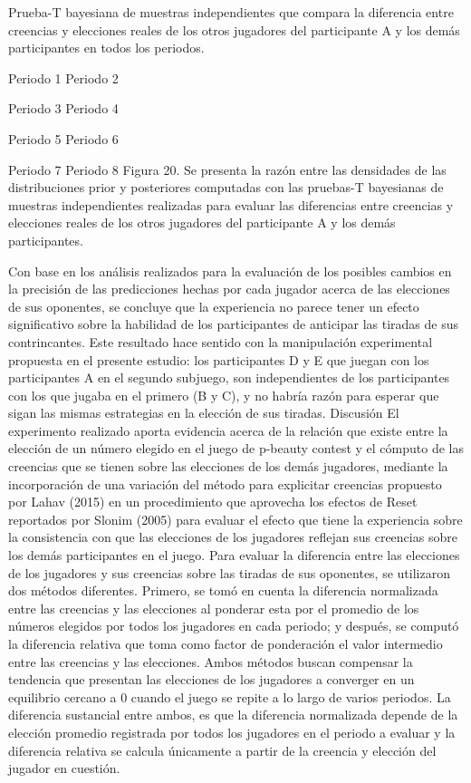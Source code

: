 Prueba-T bayesiana de muestras independientes que compara la diferencia entre creencias y elecciones reales de los otros jugadores del participante A y los demás participantes en todos los periodos.

   
Periodo 1					Periodo 2
    
Periodo 3 					Periodo 4
  
Periodo 5 					Periodo 6
  
Periodo 7 					Periodo 8
Figura 20. Se presenta la razón entre las densidades de las distribuciones prior y posteriores  computadas con las pruebas-T bayesianas de muestras independientes realizadas para evaluar las diferencias entre creencias y elecciones reales de los otros jugadores del participante A y los demás participantes.

Con base en los análisis realizados para la evaluación de los posibles cambios en la precisión de las predicciones hechas por cada jugador acerca de las elecciones de sus oponentes, se concluye que la experiencia no parece tener un efecto significativo sobre la habilidad de los participantes de anticipar las tiradas de sus contrincantes. Este resultado hace sentido con la manipulación experimental propuesta en el presente estudio: los participantes D y E que juegan con los participantes A en el segundo subjuego, son independientes de los participantes con los que jugaba en el primero (B y C), y no habría razón para esperar que sigan las mismas estrategias en la elección de sus tiradas.
	Discusión
El experimento realizado aporta evidencia acerca de la relación que existe entre la elección de un número elegido en el juego de p-beauty contest y el cómputo de las creencias que se tienen sobre las elecciones de los demás jugadores, mediante la incorporación de una variación del método para explicitar creencias propuesto por Lahav (2015) en un procedimiento que aprovecha los efectos de Reset reportados por Slonim (2005) para evaluar el efecto que tiene la experiencia sobre la consistencia con que las elecciones de los jugadores reflejan sus creencias sobre los demás participantes en el juego.
Para evaluar la diferencia entre las elecciones de los jugadores y sus creencias sobre las tiradas de sus oponentes, se utilizaron dos métodos diferentes. Primero, se tomó en cuenta la diferencia normalizada entre las creencias y las elecciones al ponderar esta por el promedio de los números elegidos por todos los jugadores en cada periodo; y después, se computó la diferencia relativa que toma como factor de ponderación el valor intermedio entre las creencias y las elecciones. Ambos métodos buscan compensar la tendencia que presentan las elecciones de los jugadores a converger en un equilibrio cercano a 0 cuando el juego se repite a lo largo de varios periodos. La diferencia sustancial entre ambos, es que la diferencia normalizada depende de la elección promedio registrada por todos los jugadores en el periodo a evaluar y  la diferencia relativa se calcula únicamente a partir de la creencia y elección del jugador en cuestión.

